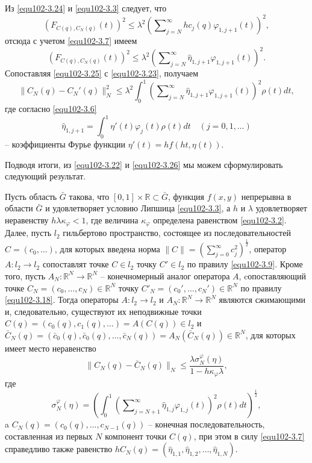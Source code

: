 Из \eqref{equ102-3.24} и \eqref{equ102-3.3} следует, что
$$
(F_{C(q),C_N(q)}(t))^2\le \lambda^2   \left(\sum\nolimits_{j=N}^\infty hc_j(q)\varphi_{1,j+1}(t)\right)^2,
$$
отсюда с учетом \eqref{equ102-3.7} имеем
\begin{equation}\label{equ102-3.25}
(F_{C(q),C_N(q)}(t))^2\le \lambda^2   \left(\sum\nolimits_{j=N}^\infty  \hat \eta_{1,j+1}\varphi_{1,j+1}(t)\right)^2.
\end{equation}
Сопоставляя \eqref{equ102-3.25} с \eqref{equ102-3.23}, получаем
\begin{equation}\label{equ102-3.26}
\|C_N(q)- C_N'(q)\|_N^2\le \lambda^2\int_{0}^1\left(\sum\nolimits_{j=N}^\infty \hat \eta_{1,j+1} \varphi_{1,j+1}(t)\right)^2\rho(t) dt,
\end{equation}
где согласно \eqref{equ102-3.6}
\begin{equation}\label{equ102-3.27}
 \hat \eta_{1,j+1}=\int_{0}^1\eta'(t)\varphi_j(t)\rho(t)dt \quad(j=0,1,\ldots)
\end{equation}
-- коэффициенты Фурье функции $\eta'(t)=hf(ht,\eta(t))$.

Подводя итоги, из \eqref{equ102-3.22} и \eqref{equ102-3.26}  мы можем сформулировать следующий результат.
\begin{theorem} Пусть область $\bar G$ такова, что $[0,1]\times\mathbb{R}\subset \bar G$, функция $f(x,y)$ непрерывна в области $\bar G$ и удовлетворяет условию Липшица \eqref{equ102-3.3}, а $h$ и $\lambda$ удовлетворяет неравенству $h\lambda\kappa_\varphi<1$, где величина $\kappa_\varphi$ определена равенством \eqref{equ102-3.2}. Далее, пусть $l_2$ гильбертово пространство, состоящее из последовательностей $C=(c_0,\ldots)$, для которых введена норма $\|C\|=\left(\sum_{j=0}^\infty c_j^2\right)^\frac12$,   оператор $A: l_2\to l_2$ сопоставлят точке $C\in l_2$ точку $C'\in l_2$ по правилу \eqref{equ102-3.9}. Кроме того, пусть $A_N:\mathbb{R}^N\to \mathbb{R}^N$ -- конечномерный аналог оператора $A$, cопоставляющий точке $C_N=(c_0,\ldots,c_{N})\in \mathbb{R}^N $ точку  $C'_N=(c_0',\ldots,c_{N}')\in \mathbb{R}^N $ по правилу \eqref{equ102-3.18}.
Тогда операторы $A: l_2\to l_2$ и $A_N:\mathbb{R}^N\to \mathbb{R}^N$ являются сжимающими и, следовательно, существуют  их неподвижные точки $C(q)=(c_0(q),c_1(q),\ldots)=A(C(q))\in l_2$ и $\bar C_N(q)=(\bar c_0(q),\bar c_0(q),\ldots,\bar c_{N}(q))=A_N(\bar C_N(q))\in \mathbb{R}^N$, для которых имеет место неравенство
\begin{equation}\label{equ102-3.28}
\|C_N(q)-\bar C_N(q)\|_N\le \frac{\lambda \sigma_N^\varphi(\eta)}{1-h\kappa_\varphi\lambda},
\end{equation}
где
\begin{equation}\label{equ102-3.29}
\sigma_N^\varphi(\eta)=\left(\int_{0}^1\left(\sum\nolimits_{j=N+1}^\infty \hat \eta_{1,j}\varphi_{1,j}(t)\right)^2\rho(t) dt\right)^\frac12,
\end{equation}
 a $C_N(q)=(c_0(q),\ldots,c_{N-1}(q))$ -- конечная последовательность, составленная из первых $N$ компонент точки  $C(q)$, при этом в силу  \eqref{equ102-3.7} справедливо также равенство  $hC_N(q)=(\hat \eta_{1,1},\hat \eta_{1,2}, \ldots, \hat \eta_{1,N})$.
\end{theorem}


